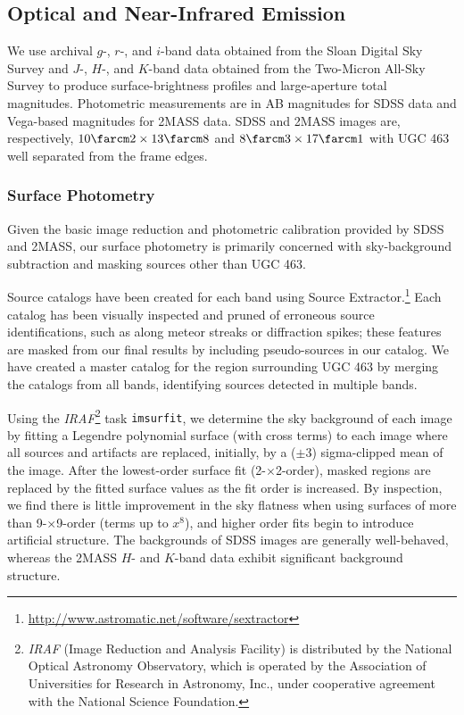 \documentclass[apj,iop,numberedappendix]{emulateapj}
\begin{document}
\subsection{Optical and Near-Infrared Emission}
\label{sec:optnir}

We use archival $g$-, $r$-, and $i$-band data obtained from the Sloan Digital
Sky Survey \citep[SDSS;][]{2000AJ....120.1579Y} and $J$-, $H$-, and $K$-band
data obtained from the Two-Micron All-Sky Survey
\citep[2MASS;][]{2006AJ....131.1163S} to produce surface-brightness profiles and
large-aperture total magnitudes.  Photometric measurements are in AB magnitudes
for SDSS data and Vega-based magnitudes for 2MASS data.  SDSS and 2MASS images
are, respectively, $10\farcm2 \times 13\farcm8$ and $8\farcm3 \times 17\farcm1$
with UGC 463 well separated from the frame edges.

\subsubsection{Surface Photometry}
\label{sec:sbprof}

Given the basic image reduction and photometric calibration provided by SDSS and
2MASS, our surface photometry is primarily concerned with sky-background
subtraction and masking sources other than UGC 463.

Source catalogs have been created for each band using Source
Extractor.\footnote{
%
\url{http://www.astromatic.net/software/sextractor}
%
}  Each catalog has been visually inspected and pruned of erroneous source
identifications, such as along meteor streaks or diffraction spikes; these
features are masked from our final results by including pseudo-sources in our
catalog.  We have created a master catalog for the region surrounding UGC 463 by
merging the catalogs from all bands, identifying sources detected in multiple
bands.

Using the {\it IRAF}\footnote{
%
{\it IRAF} (Image Reduction and Analysis Facility) is distributed by the
National Optical Astronomy Observatory, which is operated by the Association of
Universities for Research in Astronomy, Inc., under cooperative agreement with
the National Science Foundation.
%
} task {\tt imsurfit}, we determine the sky background of each image by fitting
a Legendre polynomial surface (with cross terms) to each image where all sources
and artifacts are replaced, initially, by a ($\pm3$) sigma-clipped mean of the
image.  After the lowest-order surface fit (2-$\times$2-order), masked regions
are replaced by the fitted surface values as the fit order is increased.  By
inspection, we find there is little improvement in the sky flatness when using
surfaces of more than 9-$\times$9-order (terms up to $x^8$), and higher order
fits begin to introduce artificial structure.  The backgrounds of SDSS images
are generally well-behaved, whereas the 2MASS $H$- and $K$-band data exhibit
significant background structure.
\end{document}
